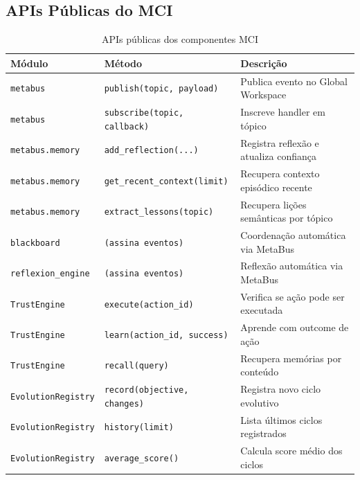 \subsection{APIs Públicas do MCI}

\begin{table}[htbp]
\centering
\caption{APIs públicas dos componentes MCI}
\label{tab:apis}
\begin{tabular}{@{}p{3.5cm}p{3.5cm}p{6.5cm}@{}}
\toprule
\textbf{Módulo} & \textbf{Método} & \textbf{Descrição} \\
\midrule
\texttt{metabus} & \texttt{publish(topic, payload)} & Publica evento no Global Workspace \\
\texttt{metabus} & \texttt{subscribe(topic, callback)} & Inscreve handler em tópico \\
\texttt{metabus.memory} & \texttt{add\_reflection(...)} & Registra reflexão e atualiza confiança \\
\texttt{metabus.memory} & \texttt{get\_recent\_context(limit)} & Recupera contexto episódico recente \\
\texttt{metabus.memory} & \texttt{extract\_lessons(topic)} & Recupera lições semânticas por tópico \\
\texttt{blackboard} & \texttt{(assina eventos)} & Coordenação automática via MetaBus \\
\texttt{reflexion\_engine} & \texttt{(assina eventos)} & Reflexão automática via MetaBus \\
\texttt{TrustEngine} & \texttt{execute(action\_id)} & Verifica se ação pode ser executada \\
\texttt{TrustEngine} & \texttt{learn(action\_id, success)} & Aprende com outcome de ação \\
\texttt{TrustEngine} & \texttt{recall(query)} & Recupera memórias por conteúdo \\
\texttt{EvolutionRegistry} & \texttt{record(objective, changes)} & Registra novo ciclo evolutivo \\
\texttt{EvolutionRegistry} & \texttt{history(limit)} & Lista últimos ciclos registrados \\
\texttt{EvolutionRegistry} & \texttt{average\_score()} & Calcula score médio dos ciclos \\
\bottomrule
\end{tabular}
\end{table}


